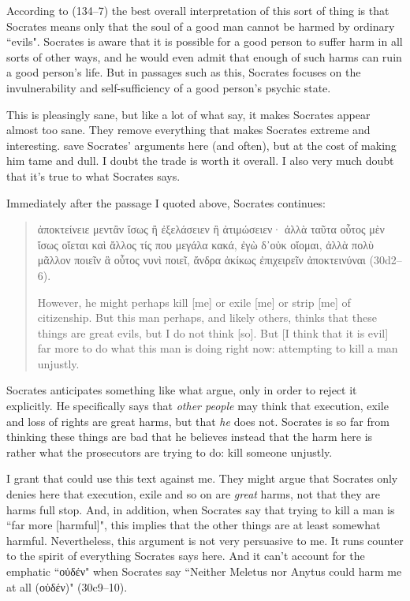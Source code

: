 \documentclass[11pt]{article}
\begin{document}
According to \citet{brickhouse2004} (134--7) the best overall interpretation of this sort of thing is that Socrates means only that the soul of a good man cannot be harmed by ordinary ``evils".  Socrates is aware that it is possible for a good person to suffer harm in all sorts of other ways, and he would even admit that enough of such harms can ruin a good person's life.  But in passages such as this, Socrates focuses on the invulnerability and self-sufficiency of a good person's psychic state.

This is pleasingly sane, but like a lot of what \citeauthor{brickhouse2004} say, it makes Socrates appear almost too sane.  They remove everything that makes Socrates extreme and interesting.  \citeauthor{brickhouse2004} save Socrates' arguments here (and often), but at the cost of making him tame and dull.  I doubt the trade is worth it overall.  I also very much doubt that it's true to what Socrates says.

Immediately after the passage I quoted above, Socrates continues:

\begin{quote}
    ἀποκτείνειε μεντἂν ἴσως ἢ ἐξελάσειεν ἢ ἀτιμώσειεν· ἀλλὰ ταῦτα οὗτος μὲν ἴσως οἴεται καὶ ἄλλος τίς που μεγάλα κακά, ἐγὼ δ᾽οὐκ οἴομαι, ἀλλὰ πολὺ μᾶλλον ποιεῖν ἃ οὗτος νυνὶ ποιεῖ, ἄνδρα ἀκίκως ἐπιχειρεῖν ἀποκτεινύναι (30d2--6).

    However, he might perhaps kill [me] or exile [me] or strip [me] of citizenship. But this man perhaps, and likely others, thinks that these things are great evils, but I do not think [so]. But [I think that it is evil] far more to do what this man is doing right now: attempting to kill a man unjustly.
\end{quote}

Socrates anticipates something like what \citeauthor{brickhouse2004} argue, only in order to reject it explicitly.  He specifically says that \emph{other people} may think that execution, exile and loss of rights are great harms, but that \emph{he} does not.  Socrates is so far from thinking these things are bad that he believes instead that the harm here is rather what the prosecutors are trying to do: kill someone unjustly.

I grant that \citeauthor{brickhouse2004} could use this text against me.  They might argue that Socrates only denies here that execution, exile and so on are \emph{great} harms, not that they are harms full stop.  And, in addition, when Socrates say that trying to kill a man is ``far more [harmful]", this implies that the other things are at least somewhat harmful.  Nevertheless, this argument is not very persuasive to me.  It runs counter to the spirit of everything Socrates says here. And it can't account for the emphatic ``οὐδέν" when Socrates say ``Neither Meletus nor Anytus could harm me at all (οὐδέν)" (30c9--10).
\end{document}
